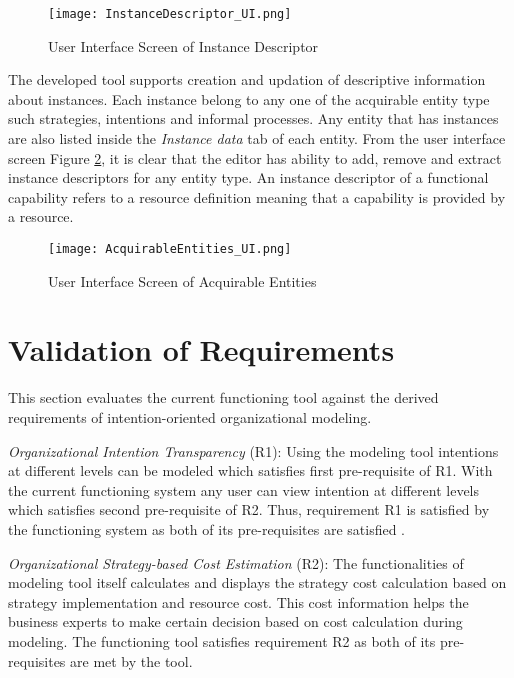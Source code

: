 \begin{figure}
	\centering
	\texttt{[image: InstanceDescriptor\_UI.png]}
	\caption{User Interface Screen of Instance Descriptor}
	\label{fig:realizationofinstances2}
\end{figure}

The developed tool supports creation and updation of descriptive information about instances. Each instance belong to any one of the acquirable entity type such strategies, intentions and informal processes. Any entity that has instances are also listed inside the \textit{Instance data} tab of each entity. From the user interface screen Figure \ref{fig:realizationofinstances}, it is clear that the editor has ability to add, remove and extract instance descriptors for any entity type. An instance descriptor of a functional capability refers to a resource definition meaning that a capability is provided by a resource.
 
\begin{figure}
	\centering
	\texttt{[image: AcquirableEntities\_UI.png]}
	\caption{User Interface Screen of Acquirable Entities}
	\label{fig:realizationofinstances}
\end{figure}

		
\section{Validation of Requirements}
\label{sec:validation}
This section evaluates the current functioning tool against the derived requirements of intention-oriented organizational modeling. 

\textit{Organizational Intention Transparency} (R1):  Using the modeling tool intentions at different levels can be modeled which satisfies first pre-requisite of R1. With the current functioning system any user can view intention at different levels which satisfies second pre-requisite of R2. Thus, requirement R1 is satisfied by the functioning system as both of its pre-requisites are satisfied .

\textit{Organizational Strategy-based Cost Estimation} (R2): The functionalities of modeling tool itself calculates and displays the strategy cost calculation based on strategy implementation and resource cost. This cost information helps the business experts to make certain decision based on cost calculation during modeling. The functioning tool satisfies requirement R2 as both of its pre-requisites are met by the tool. 

